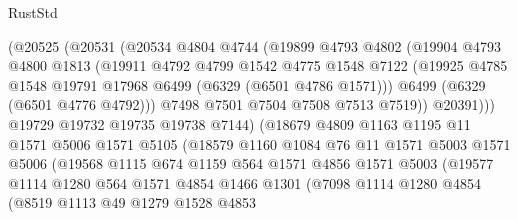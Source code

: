 \begin{lexlean}{RustStd}
\begin{coremodule}
{{                    (@20525
                      (@20531
                        (@20534
                          @4804
                          @4744
                          (@19899
                            @4793
                            @4802
                            (@19904
                              @4793
                              @4800
                              @1813
                              (@19911
                                @4792
                                @4799
                                @1542
                                @4775
                                @1548
                                @7122
                                (@19925 @4785 @1548 @19791 @17968 @6499 (@6329 (@6501 @4786 @1571)))
                                @6499
                                (@6329 (@6501 @4776 @4792)))
                              @7498
                              @7501
                              @7504
                              @7508
                              @7513
                              @7519))
                          @20391)))
                    @19729
                    @19732
                    @19735
                    @19738
                    @7144)
                  (@18679
                    @4809
                    @1163
                    @1195
                    @11
                    @1571
                    @5006
                    @1571
                    @5105
                    (@18579
                      @1160
                      @1084
                      @76
                      @11
                      @1571
                      @5003
                      @1571
                      @5006
                      (@19568
                        @1115
                        @674
                        @1159
                        @564
                        @1571
                        @4856
                        @1571
                        @5003
                        (@19577
                          @1114
                          @1280
                          @564
                          @1571
                          @4854
                          @1466
                          @1301
                          (@7098
                            @1114
                            @1280
                            @4854
                            (@8519
                              @1113
                              @49
                              @1279
                              @1528
                              @4853
}}
\end{coremodule}
\end{lexlean}
